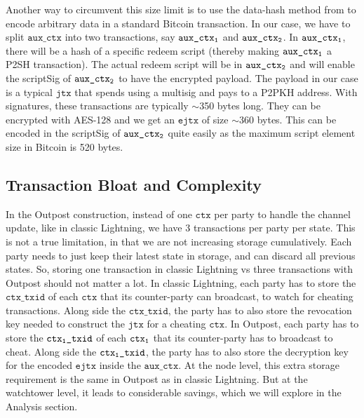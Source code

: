 Another way to circumvent this size limit is to use the data-hash method from \cite{sward2018data} to encode arbitrary data in a standard Bitcoin transaction. In our case, we have to split $\texttt{aux\_ctx}$ into two transactions, say $\texttt{aux\_ctx\textsubscript{1}}$ and $\texttt{aux\_ctx\textsubscript{2}}$. In $\texttt{aux\_ctx\textsubscript{1}}$, there will be a hash of a specific redeem script (thereby making $\texttt{aux\_ctx\textsubscript{1}}$ a P2SH transaction). The actual redeem script will be in $\texttt{aux\_ctx\textsubscript{2}}$ and will enable the scriptSig of $\texttt{aux\_ctx\textsubscript{2}}$ to have the encrypted payload. The payload in our case is a typical $\texttt{jtx}$ that spends using a multisig and pays to a P2PKH address. With signatures, these transactions are typically $\sim$350 bytes long. They can be encrypted with AES-128 and we get an $\texttt{ejtx}$ of size $\sim$360 bytes. This can be encoded in the scriptSig of $\texttt{aux\_ctx\textsubscript{2}}$ quite easily as the maximum script element size in Bitcoin is 520 bytes.

\subsection{Transaction Bloat and Complexity}
In the Outpost construction, instead of one $\texttt{ctx}$ per party to handle the channel update, like in classic Lightning, we have 3 transactions per party per state. This is not a true limitation, in that we are not increasing storage cumulatively. Each party needs to just keep their latest state in storage, and can discard all previous states. So, storing one transaction in classic Lightning vs three transactions with Outpost should not matter a lot. In classic Lightning, each party has to store the $\texttt{ctx\_txid}$ of each $\texttt{ctx}$ that its counter-party can broadcast, to watch for cheating transactions. Along side the $\texttt{ctx\_txid}$, the party has to also store the revocation key needed to construct the $\texttt{jtx}$ for a cheating $\texttt{ctx}$. In Outpost, each party has to store the $\texttt{ctx\textsubscript{1}\_txid}$ of each $\texttt{ctx\textsubscript{1}}$ that its counter-party has to broadcast to cheat. Along side the $\texttt{ctx\textsubscript{1}\_txid}$, the party has to also store the decryption key for the encoded $\texttt{ejtx}$ inside the $\texttt{aux\_ctx}$. At the node level, this extra storage requirement is the same in Outpost as in classic Lightning. But at the watchtower level, it leads to considerable savings, which we will explore in the Analysis section.

